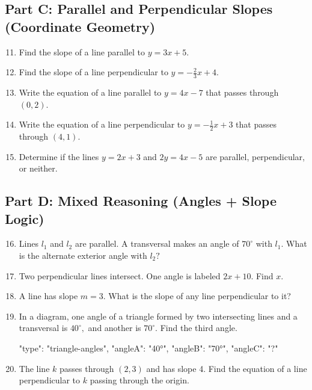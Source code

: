 \documentclass[14pt]{extarticle}
\begin{document}
\subsection*{Part C: Parallel and Perpendicular Slopes (Coordinate Geometry)}
\begin{enumerate}
  \setcounter{enumi}{10}
  \item Find the slope of a line parallel to \(y = 3x + 5.\)
  \item Find the slope of a line perpendicular to \(y = -\frac{2}{3}x + 4.\)
  \item Write the equation of a line parallel to \(y = 4x - 7\) that passes through \((0, 2).\)
  \item Write the equation of a line perpendicular to \(y = -\tfrac{1}{2}x + 3\) that passes through \((4, 1).\)
  \item Determine if the lines \(y = 2x + 3\) and \(2y = 4x - 5\) are parallel, perpendicular, or neither.
\end{enumerate}

\subsection*{Part D: Mixed Reasoning (Angles + Slope Logic)}
\begin{enumerate}
  \setcounter{enumi}{15}
  \item Lines \(l_1\) and \(l_2\) are parallel. A transversal makes an angle of \(70^\circ\) with \(l_1.\) What is the alternate exterior angle with \(l_2?\)
  \item Two perpendicular lines intersect. One angle is labeled \(2x + 10.\) Find \(x.\)
  \item A line has slope \(m = 3.\) What is the slope of any line perpendicular to it?
  \item In a diagram, one angle of a triangle formed by two intersecting lines and a transversal is \(40^\circ,\) and another is \(70^\circ.\) Find the third angle.
  \begin{diagramdata}
  {
    "type": "triangle-angles",
    "angleA": "40°",
    "angleB": "70°",
    "angleC": "?"
  }
  \end{diagramdata}
  \item The line \(k\) passes through \((2, 3)\) and has slope 4. Find the equation of a line perpendicular to \(k\) passing through the origin.
\end{enumerate}
\end{document}
